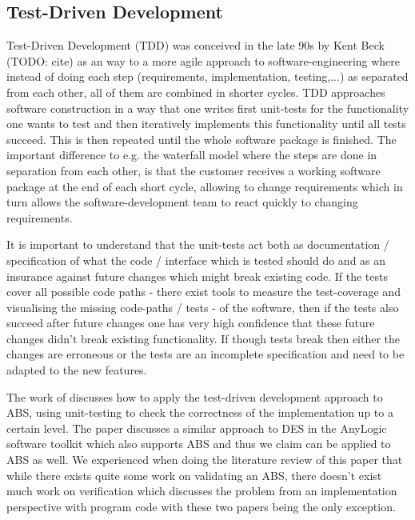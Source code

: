\subsection{Test-Driven Development}
Test-Driven Development (TDD) was conceived in the late 90s by Kent Beck (TODO: cite) as an way to a more agile approach to software-engineering where instead of doing each step (requirements, implementation, testing,...) as separated from each other, all of them are combined in shorter cycles. TDD approaches software construction in a way that one writes first unit-tests for the functionality one wants to test and then iteratively implements this functionality until all tests succeed. This is then repeated until the whole software package is finished. The important difference to e.g. the waterfall model where the steps are done in separation from each other, is that the customer receives a working software package at the end of each short cycle, allowing to change requirements which in turn allows the software-development team to react quickly to changing requirements.

It is important to understand that the unit-tests act both as documentation / specification of what the code / interface which is tested should do and as an insurance against future changes which might break existing code. If the tests cover all possible code paths - there exist tools to measure the test-coverage and visualising the missing code-paths / tests - of the software, then if the tests also succeed after future changes one has very high confidence that these future changes didn't break existing functionality. If though tests break then either the changes are erroneous or the tests are an incomplete specification and need to be adapted to the new features.

The work of \cite{collier_test-driven_2013} discusses how to apply the test-driven development approach to ABS, using unit-testing to check the correctness of the implementation up to a certain level. The paper \cite{asta_investigation_2014} discusses a similar approach to DES in the AnyLogic software toolkit which also supports ABS and thus we claim can be applied to ABS as well. We experienced when doing the literature review of this paper that while there exists quite some work on validating an ABS, there doesn't exist much work on verification which discusses the problem from an implementation perspective with program code with these two papers being the only exception.

